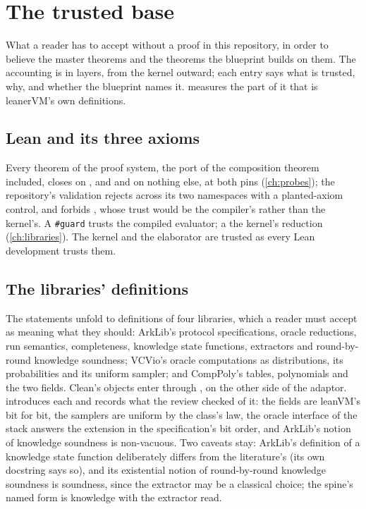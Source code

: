 \chapter{The trusted base}\label{ch:tcb}

What a reader has to accept without a proof in this repository, in order to believe the
master theorems and the theorems the blueprint builds on them. The accounting is in layers,
from the kernel outward; each entry says what is trusted, why, and whether the blueprint names
it.  measures the part of it that is leanerVM's own definitions.

\section{Lean and its three axioms}

Every theorem of the proof system, the port of the composition theorem included, closes on
,  and  and on nothing else, at both pins
(\cref{ch:probes}); the repository's validation rejects  across its two
namespaces with a planted-axiom control, and forbids , whose trust would be
the compiler's rather than the kernel's. A \texttt{\#guard} trusts the compiled evaluator; a
 the kernel's reduction (\cref{ch:libraries}). The kernel and the elaborator are
trusted as every Lean development trusts them.

\section{The libraries' definitions}

The statements unfold to definitions of four libraries, which a reader must accept as meaning
what they should: ArkLib's protocol specifications, oracle reductions, run semantics,
completeness, knowledge state functions, extractors and round-by-round knowledge soundness;
VCVio's oracle computations as distributions, its probabilities and its uniform sampler; and
CompPoly's tables, polynomials and the two fields. Clean's objects enter through
, on the other side of the adaptor.  introduces each and
records what the review checked of it: the fields are leanVM's bit for bit, the samplers are
uniform by the class's law, the oracle interface of the stack answers the extension in the
specification's bit order, and ArkLib's notion of knowledge soundness is non-vacuous. Two
caveats stay: ArkLib's definition of a knowledge state function deliberately differs from the
literature's (its own docstring says so), and its existential notion of round-by-round
knowledge soundness is soundness, since the extractor may be a classical choice; the spine's
named form is knowledge with the extractor read.

